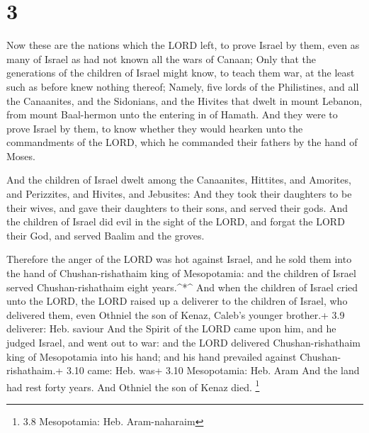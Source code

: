 \hypertarget{section-2}{%
\section{3}\label{section-2}}

 Now these are the nations which the LORD left, to prove
Israel by them, even as many of Israel as had not known all the wars of
Canaan;  Only that the generations of the children of Israel
might know, to teach them war, at the least such as before knew nothing
thereof;  Namely, five lords of the Philistines, and all the
Canaanites, and the Sidonians, and the Hivites that dwelt in mount
Lebanon, from mount Baal-hermon unto the entering in of Hamath.
 And they were to prove Israel by them, to know whether they
would hearken unto the commandments of the LORD, which he commanded
their fathers by the hand of Moses.

 And the children of Israel dwelt among the Canaanites,
Hittites, and Amorites, and Perizzites, and Hivites, and Jebusites:
 And they took their daughters to be their wives, and gave
their daughters to their sons, and served their gods.  And
the children of Israel did evil in the sight of the LORD, and forgat the
LORD their God, and served Baalim and the groves.

 Therefore the anger of the LORD was hot against Israel, and
he sold them into the hand of Chushan-rishathaim king of Mesopotamia:
and the children of Israel served Chushan-rishathaim eight
years.\^{}*\^{}  And when the children of Israel cried unto
the LORD, the LORD raised up a deliverer to the children of Israel, who
delivered them, even Othniel the son of Kenaz, Caleb's younger brother.+
3.9 deliverer: Heb. saviour  And the Spirit of the LORD
came upon him, and he judged Israel, and went out to war: and the LORD
delivered Chushan-rishathaim king of Mesopotamia into his hand; and his
hand prevailed against Chushan-rishathaim.+ 3.10 came: Heb. was+ 3.10
Mesopotamia: Heb. Aram  And the land had rest forty years.
And Othniel the son of Kenaz died. \footnote{3.8 Mesopotamia: Heb.
  Aram-naharaim}

